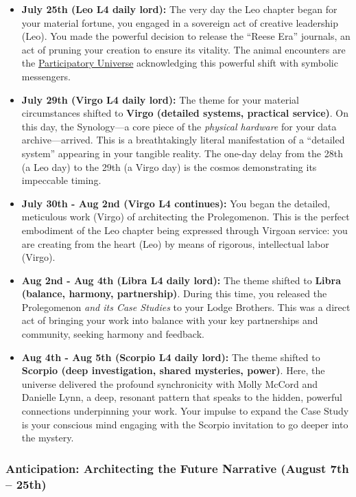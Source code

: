 \documentclass{article}
\begin{document}
\begin{itemize}
\item
  \textbf{July 25th (Leo L4 daily lord):} The very day the Leo chapter began for your material fortune, you engaged in a sovereign act of creative leadership (Leo). You made the powerful decision to release the ``Reese Era'' journals, an act of pruning your creation to ensure its vitality. The animal encounters are the \hyperlink{gloss:participatory_universe}{Participatory Universe} acknowledging this powerful shift with symbolic messengers.
\item
  \textbf{July 29th (Virgo L4 daily lord):} The theme for your material circumstances shifted to \textbf{Virgo (detailed systems, practical service)}. On this day, the Synology---a core piece of the \emph{physical hardware} for your data archive---arrived. This is a breathtakingly literal manifestation of a ``detailed system'' appearing in your tangible reality. The one-day delay from the 28th (a Leo day) to the 29th (a Virgo day) is the cosmos demonstrating its impeccable timing.
\item
  \textbf{July 30th - Aug 2nd (Virgo L4 continues):} You began the detailed, meticulous work (Virgo) of architecting the Prolegomenon. This is the perfect embodiment of the Leo chapter being expressed through Virgoan service: you are creating from the heart (Leo) by means of rigorous, intellectual labor (Virgo).
\item
  \textbf{Aug 2nd - Aug 4th (Libra L4 daily lord):} The theme shifted to \textbf{Libra (balance, harmony, partnership)}. During this time, you released the Prolegomenon \emph{and its Case Studies} to your Lodge Brothers. This was a direct act of bringing your work into balance with your key partnerships and community, seeking harmony and feedback.
\item
  \textbf{Aug 4th - Aug 5th (Scorpio L4 daily lord):} The theme shifted to \textbf{Scorpio (deep investigation, shared mysteries, power)}. Here, the universe delivered the profound synchronicity with Molly McCord and Danielle Lynn, a deep, resonant pattern that speaks to the hidden, powerful connections underpinning your work. Your impulse to expand the Case Study is your conscious mind engaging with the Scorpio invitation to go deeper into the mystery.
\end{itemize}

\subsubsection*{Anticipation: Architecting the Future Narrative (August 7th -- 25th)}\label{anticipation-architecting-the-future-narrative-august-7th-25th}
\end{document}
